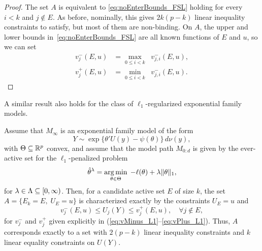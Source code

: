 \documentclass{article}
\begin{document}
\begin{proof}
  The set $A$ is equivalent to 
  \eqref{eq:noEnterBounds_FSL} holding
  for every $i < k$ and $j \notin E$. As before, nominally, this gives $2k(p-k)$ 
  linear inequality constraints to satisfy, but most of them are
  non-binding. On $A$, the upper and lower bounds
  in~\eqref{eq:noEnterBounds_FSL}
  are all known functions of $E$ and $u$, so we can set
  \begin{align}\label{eq:vMinus_FSL}
    v_j^-(E,u) &= \max_{0 \leq i < k} \;\;v_{j,i}^-(E,u),\\
    \label{eq:vPlus_FSL}
    v_j^+(E,u) &= \min_{0 \leq i < k} \;\;v_{j,i}^-(E,u).
  \end{align}
\end{proof}

A similar result also holds for the class of $\ell_1$-regularized exponential family models. %

\begin{theorem}
  Assume that $M_\infty$ is an exponential family model
  of the form
  \[
  Y \sim \exp\{ \theta'U(y) - \psi(\theta) \}\,d\nu(y),
  \]
  with $\Theta \subseteq \mathbb{R}^p$ convex, and assume
  that the model path $M_{0:d}$ is given 
  by the ever-active set for the $\ell_1$-penalized problem
  \begin{equation}\label{eq:regProblem}
  \hat\theta^\lambda = \operatorname*{arg\,min}_{\theta\in \Theta} \;
  -\ell(\theta) + \lambda\|\theta\|_1,
  \end{equation}
  for $\lambda\in \Lambda \subseteq [0,\infty)$.
  Then, for a candidate active set $E$ of size $k$, 
  the set $A = \{E_k = E, \;U_E = u\}$ is characterized 
  exactly by the constraints $U_E = u$ and
  \[
  v_j^-(E,u) \leq U_j(Y) \leq v_j^+(E,u), \quad\forall j \notin E,
  \]
  for $v_j^-$ and $v_j^+$ given explicitly in
  (\ref{eq:vMinus_L1}--\ref{eq:vPlus_L1}).
  Thus, $A$ corresponds exactly to 
  a set with $2(p-k)$ linear inequality constraints and $k$
  linear equality constraints on $U(Y)$.
\end{theorem}

\end{document}
